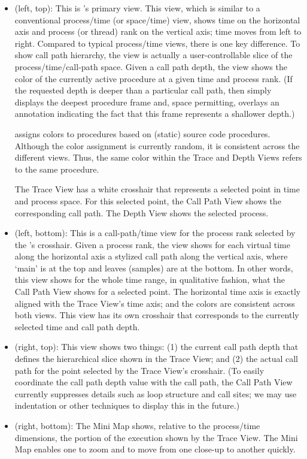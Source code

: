 \begin{itemize}
\item \textbf{\traceview} (left, top):
  This is \hpctraceviewer{}'s primary view.
  This view, which is similar to a conventional process/time (or space/time) view, shows time on the horizontal axis and process (or thread) rank on the vertical axis; time moves from left to right.
  Compared to typical process/time views, there is one key difference.
  To show call path hierarchy, the view is actually a user-controllable slice of the process/time/call-path space.
  Given a call path depth, the view shows the color of the currently active procedure at a given time and process rank.
  (If the requested depth is deeper than a particular call path, then \hpctraceviewer{} simply displays the deepest procedure frame and, space permitting, overlays an annotation indicating the fact that this frame represents a shallower depth.)

  \hpctraceviewer{} assigns colors to procedures based on (static) source code procedures.
  Although the color assignment is currently random, it is consistent across the different views.
  Thus, the same color within the Trace and Depth Views refers to the same procedure.

  The Trace View has a white crosshair that represents a selected point in time and process space.
  For this selected point, the Call Path View shows the corresponding call path.
  The Depth View shows the selected process.

\item \textbf{\depthview} (left, bottom):
  This is a call-path/time view for the process rank selected by the \traceview's crosshair.
  Given a process rank, the view shows for each virtual time along the horizontal axis a stylized call path along the vertical axis, where `main' is at the top and leaves (samples) are at the bottom.
  In other words, this view shows for the whole time range, in qualitative fashion, what the Call Path View shows for a selected point.
  The horizontal time axis is exactly aligned with the Trace View's time axis; and the colors are consistent across both views.
  This view has its own crosshair that corresponds to the currently selected time and call path depth.

\item \textbf{\callview} (right, top):
  This view shows two things: (1) the current call path depth that defines the hierarchical slice shown in the Trace View; and (2) the actual call path for the point selected by the Trace View's crosshair.
  (To easily coordinate the call path depth value with the call path, the Call Path View currently suppresses details such as loop structure and call sites; we may use indentation or other techniques to display this in the future.)

\item \textbf{\miniview} (right, bottom):
  The Mini Map shows, relative to the process/time dimensions, the portion of the execution shown by the Trace View.
  The Mini Map enables one to zoom and to move from one close-up to another quickly.

\end{itemize}

